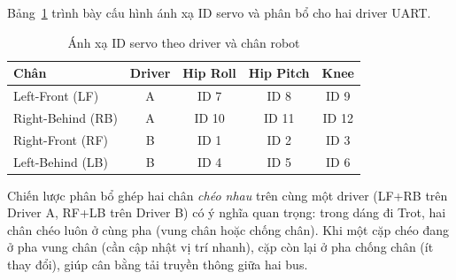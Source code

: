 Bảng~\ref{tab:servo_mapping} trình bày cấu hình ánh xạ ID servo và phân bổ cho hai driver UART.

\begin{table}[H]
\centering
\caption{Ánh xạ ID servo theo driver và chân robot}
\label{tab:servo_mapping}
\renewcommand{\arraystretch}{1.3}
\begin{tabular}{|l|c|c|c|c|}
\hline
\textbf{Chân} & \textbf{Driver} & \textbf{Hip Roll} & \textbf{Hip Pitch} & \textbf{Knee} \\ \hline
Left-Front (LF) & A & ID 7 & ID 8 & ID 9 \\ \hline
Right-Behind (RB) & A & ID 10 & ID 11 & ID 12 \\ \hline
Right-Front (RF) & B & ID 1 & ID 2 & ID 3 \\ \hline
Left-Behind (LB) & B & ID 4 & ID 5 & ID 6 \\ \hline
\end{tabular}
\end{table}

Chiến lược phân bổ ghép hai chân \textit{chéo nhau} trên cùng một driver (LF+RB trên Driver A, RF+LB trên Driver B) có ý nghĩa quan trọng: trong dáng đi Trot, hai chân chéo luôn ở cùng pha (vung chân hoặc chống chân). Khi một cặp chéo đang ở pha vung chân (cần cập nhật vị trí nhanh), cặp còn lại ở pha chống chân (ít thay đổi), giúp cân bằng tải truyền thông giữa hai bus.

